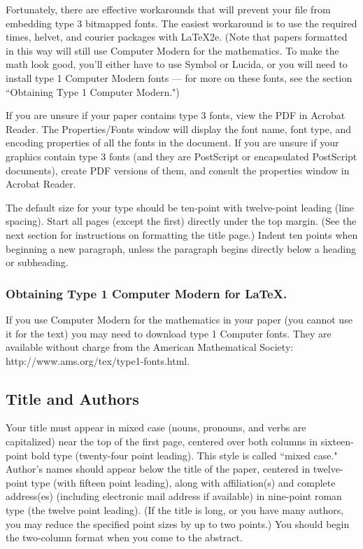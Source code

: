 \documentclass[letterpaper]{article}
\begin{document}
Fortunately, there are effective workarounds that will prevent your file from embedding type 3 bitmapped fonts. The easiest workaround is to use the required times, helvet, and courier packages with \LaTeX{}2e. (Note that papers formatted in this way will still use Computer Modern for the mathematics. To make the math look good, you'll either have to use Symbol or Lucida, or you will need to install type 1 Computer Modern fonts --- for more on these fonts, see the section ``Obtaining Type 1 Computer Modern.")

If you are unsure if your paper contains type 3 fonts, view the PDF in Acrobat Reader. The Properties/Fonts window will display the font name, font type, and encoding properties of all the fonts in the document. If you are unsure if your graphics contain type 3 fonts (and they are PostScript or encapsulated PostScript documents), create PDF versions of them, and consult the properties window in Acrobat Reader. 

The default size for your type should be ten-point with twelve-point leading (line spacing). Start all pages (except the first) directly under the top margin. (See the next section for instructions on formatting the title page.) Indent ten points when beginning a new paragraph, unless the paragraph begins directly below a heading or subheading.

\subsubsection{Obtaining Type 1 Computer Modern for \LaTeX{}.}

If you use Computer Modern for the mathematics in your paper (you cannot use it for the text) you may need to download type 1 Computer fonts. They are available without charge from the American Mathematical Society:
http://www.ams.org/tex/type1-fonts.html. 

\subsection{Title and Authors}
Your title must appear in mixed case (nouns, pronouns, and verbs are capitalized) near the top of the first page, centered over both columns in sixteen-point bold type (twenty-four point leading). This style is called ``mixed case." Author's names should appear below the title of the paper, centered in twelve-point type (with fifteen point leading), along with affiliation(s) and complete address(es) (including electronic mail address if available) in nine-point roman type (the twelve point leading). (If the title is long, or you have many authors, you may reduce the specified point sizes by up to two points.) You should begin the two-column format when you come to the abstract. 
\end{document}

